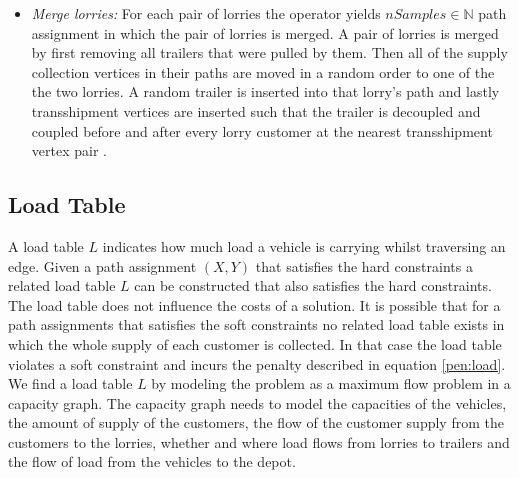 \begin{itemize}
  \item \textit{Merge lorries:} For each pair of lorries the operator  yields $nSamples \in \mathbb N$  path assignment in which the pair of lorries is merged. A pair of lorries is merged by first removing all trailers that were pulled by them. Then all of the supply collection vertices in their paths are moved in a random order to one of the the two lorries. A random trailer is inserted into that lorry's path and lastly transshipment vertices are inserted such that the  trailer is decoupled and coupled before and after every lorry customer at the nearest transshipment vertex pair .
\end{itemize}


\subsection{Load Table}
\label{sec:load}
A load table
$L$
indicates how much load a vehicle is carrying whilst traversing an edge.
Given a path assignment $(X,Y)$ that satisfies the hard constraints a related load table
$L$
can be constructed  that also satisfies the hard constraints.
 The load table does not influence the costs of a solution.
 It is  possible that for a path assignments that satisfies the soft constraints no related load table exists in which the whole supply of each customer is collected.
In that case the load table violates a soft constraint and incurs the penalty described in equation \eqref{pen:load}.
\\

We find a load table $L$ by modeling the problem as a maximum flow problem in a capacity graph.
The capacity graph needs to model the capacities of the vehicles,
the amount of supply of the customers,
the flow of the customer supply from the customers to the lorries,
whether and where load flows from lorries to trailers   and
the flow of load from the vehicles to the depot.\\





